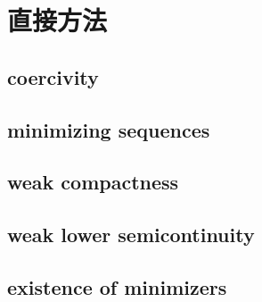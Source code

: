 \section{直接方法}
\label{b2:sec:1404}


\subsection{coercivity}
\label{b2:subsec:140401}

\subsection{minimizing sequences}
\label{b2:subsec:140402}

\subsection{weak compactness}
\label{b2:subsec:140403}

\subsection{weak lower semicontinuity}
\label{b2:subsec:140404}

\subsection{existence of minimizers}
\label{b2:subsec:140405}


